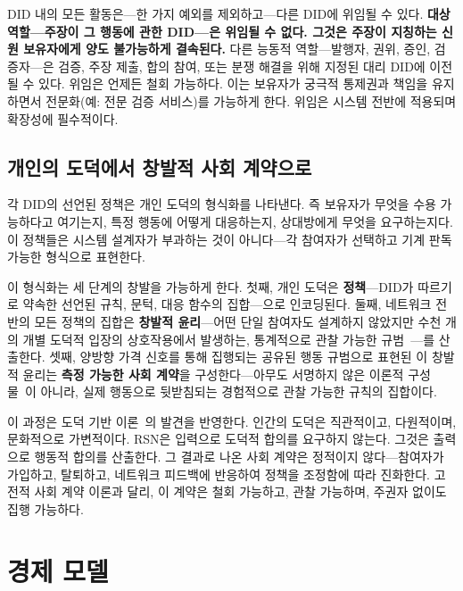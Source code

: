 \documentclass[11pt,a4paper,twocolumn]{article}
\begin{document}
DID 내의 모든 활동은---한 가지 예외를 제외하고---다른 DID에 위임될 수 있다. \textbf{대상 역할---주장이 그 행동에 관한 DID---은 위임될 수 없다. 그것은 주장이 지칭하는 신원 보유자에게 양도 불가능하게 결속된다.} 다른 능동적 역할---발행자, 권위, 증인, 검증자---은 검증, 주장 제출, 합의 참여, 또는 분쟁 해결을 위해 지정된 대리 DID에 이전될 수 있다. 위임은 언제든 철회 가능하다. 이는 보유자가 궁극적 통제권과 책임을 유지하면서 전문화(예: 전문 검증 서비스)를 가능하게 한다. 위임은 시스템 전반에 적용되며 확장성에 필수적이다.

\subsection{개인의 도덕에서 창발적 사회 계약으로}

각 DID의 선언된 정책은 개인 도덕의 형식화를 나타낸다. 즉 보유자가 무엇을 수용 가능하다고 여기는지, 특정 행동에 어떻게 대응하는지, 상대방에게 무엇을 요구하는지다. 이 정책들은 시스템 설계자가 부과하는 것이 아니다---각 참여자가 선택하고 기계 판독 가능한 형식으로 표현한다.

이 형식화는 세 단계의 창발을 가능하게 한다. 첫째, 개인 도덕은 \textbf{정책}---DID가 따르기로 약속한 선언된 규칙, 문턱, 대응 함수의 집합---으로 인코딩된다. 둘째, 네트워크 전반의 모든 정책의 집합은 \textbf{창발적 윤리}---어떤 단일 참여자도 설계하지 않았지만 수천 개의 개별 도덕적 입장의 상호작용에서 발생하는, 통계적으로 관찰 가능한 규범~\cite{durkheim1893}---를 산출한다. 셋째, 양방향 가격 신호를 통해 집행되는 공유된 행동 규범으로 표현된 이 창발적 윤리는 \textbf{측정 가능한 사회 계약}을 구성한다---아무도 서명하지 않은 이론적 구성물~\cite{rawls1971}이 아니라, 실제 행동으로 뒷받침되는 경험적으로 관찰 가능한 규칙의 집합이다.

이 과정은 도덕 기반 이론~\cite{haidt2012}의 발견을 반영한다. 인간의 도덕은 직관적이고, 다원적이며, 문화적으로 가변적이다. RSN은 입력으로 도덕적 합의를 요구하지 않는다. 그것은 출력으로 행동적 합의를 산출한다. 그 결과로 나온 사회 계약은 정적이지 않다---참여자가 가입하고, 탈퇴하고, 네트워크 피드백에 반응하여 정책을 조정함에 따라 진화한다. 고전적 사회 계약 이론과 달리, 이 계약은 철회 가능하고, 관찰 가능하며, 주권자 없이도 집행 가능하다.

\section{경제 모델}
\end{document}
